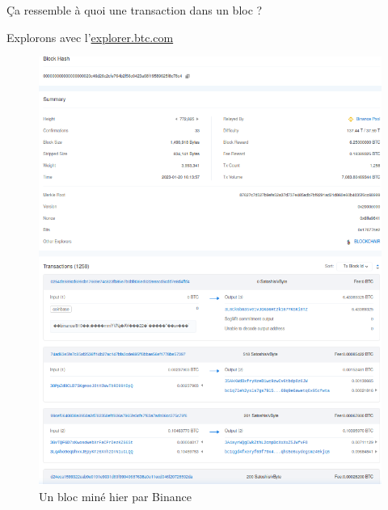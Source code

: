 \documentclass[presentation]{beamer}
\begin{document}
\begin{frame}[label={sec:org71f5f62}]{Ça ressemble à quoi une transaction dans un bloc ?}
\begin{block}{Explorons avec l'\href{https://explorer.btc.com/btc/block/772825}{explorer.btc.com}}
\begin{figure}[htbp]
\centering
\includegraphics[height=.8\textheight]{Images/binance_bloc.png}
\caption{Un bloc miné hier par Binance}
\end{figure}
\end{block}
\end{frame}
\end{document}

